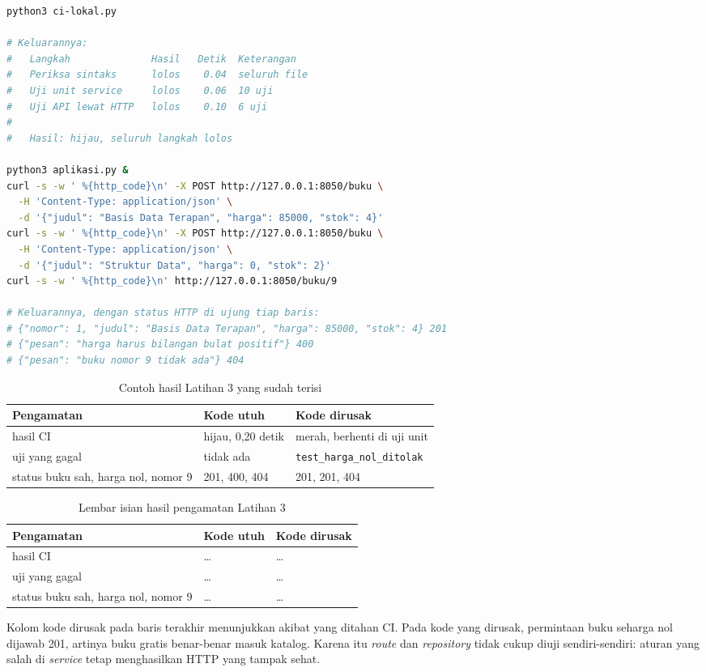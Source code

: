 \begin{lstlisting}[language=bash, caption={CI lokal lalu tiga permintaan ke API, tersedia di \berkas{sources/chapter01/}}, label={lst:c01-lat3-jalan}]
python3 ci-lokal.py

# Keluarannya:
#   Langkah              Hasil   Detik  Keterangan
#   Periksa sintaks      lolos    0.04  seluruh file
#   Uji unit service     lolos    0.06  10 uji
#   Uji API lewat HTTP   lolos    0.10  6 uji
#
#   Hasil: hijau, seluruh langkah lolos

python3 aplikasi.py &
curl -s -w ' %{http_code}\n' -X POST http://127.0.0.1:8050/buku \
  -H 'Content-Type: application/json' \
  -d '{"judul": "Basis Data Terapan", "harga": 85000, "stok": 4}'
curl -s -w ' %{http_code}\n' -X POST http://127.0.0.1:8050/buku \
  -H 'Content-Type: application/json' \
  -d '{"judul": "Struktur Data", "harga": 0, "stok": 2}'
curl -s -w ' %{http_code}\n' http://127.0.0.1:8050/buku/9

# Keluarannya, dengan status HTTP di ujung tiap baris:
# {"nomor": 1, "judul": "Basis Data Terapan", "harga": 85000, "stok": 4} 201
# {"pesan": "harga harus bilangan bulat positif"} 400
# {"pesan": "buku nomor 9 tidak ada"} 404
\end{lstlisting}

\begin{table}[!htb]
  \centering
  \caption{Contoh hasil Latihan 3 yang sudah terisi}
  \label{tab:c01-lat3-contoh}
  \begin{tabularx}{\textwidth}{Xll}
    \hline
    \textbf{Pengamatan} & \textbf{Kode utuh} & \textbf{Kode dirusak} \\
    \hline
    hasil CI & hijau, 0,20 detik & merah, berhenti di uji unit \\
    \hline
    uji yang gagal & tidak ada & \texttt{test\_harga\_nol\_ditolak} \\
    \hline
    status buku sah, harga nol, nomor 9 & 201, 400, 404 & 201, 201, 404 \\
    \hline
  \end{tabularx}
\end{table}

\begin{table}[!htb]
  \centering
  \caption{Lembar isian hasil pengamatan Latihan 3}
  \label{tab:c01-lat3-hasil}
  \begin{tabularx}{\textwidth}{Xll}
    \hline
    \textbf{Pengamatan} & \textbf{Kode utuh} & \textbf{Kode dirusak} \\
    \hline
    hasil CI & \dots & \dots \\
    \hline
    uji yang gagal & \dots & \dots \\
    \hline
    status buku sah, harga nol, nomor 9 & \dots & \dots \\
    \hline
  \end{tabularx}
\end{table}

Kolom kode dirusak pada baris terakhir menunjukkan akibat yang ditahan CI.
Pada kode yang dirusak, permintaan buku seharga nol dijawab 201, artinya buku
gratis benar-benar masuk katalog. Karena itu \textit{route} dan
\textit{repository} tidak cukup diuji sendiri-sendiri: aturan yang salah di
\textit{service} tetap menghasilkan HTTP yang tampak sehat.

